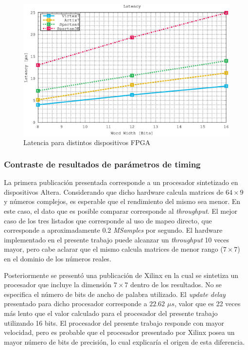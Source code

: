 \begin{figure}[htb!]
    \centering
        \includegraphics[width = 11 cm]{./figures/C05-latency}
        \caption{Latencia para distintos dispositivos FPGA}
        \label{fig:latency}
\end{figure}

\newpage

\subsubsection{Contraste de resultados de parámetros de timing}

La primera publicación presentada \cite{AlteraQR} corresponde a un procesador sintetizado en dispositivos Altera. Considerando que dicho hardware calcula matrices de $64 \times 9$ y números complejos, es esperable que el rendimiento del mismo sea menor. En este caso, el dato que es posible comparar corresponde al \textit{throughput}. El mejor caso de los tres listados que corresponde al uso de mapeo directo, que corresponde a aproximadamente 0.2 \textit{MSamples} por segundo. El hardware implementado en el presente trabajo puede alcanzar un \textit{throughput} 10 veces mayor, pero cabe aclarar que el mismo calcula  matrices de menor rango ($7 \times 7$) en el dominio de los números reales.

Posteriormente se presentó una publicación de Xilinx \cite{XilinxQR} en la cual se sintetiza un procesador que incluye la dimensión $7 \times 7$ dentro de los resultados. No se especifica el número de bits de ancho de palabra utilizado. El \textit{update delay} presentado para dicho procesador corresponde a $22.62$ $\mu s$, valor que es 22 veces más lento que el valor calculado para el procesador del presente trabajo utilizando 16 bits. El procesador del presente trabajo responde con mayor velocidad, pero es probable que el procesador presentado por Xilinx posea un mayor número de bits de precisión, lo cual explicaría el origen de esta diferencia.


